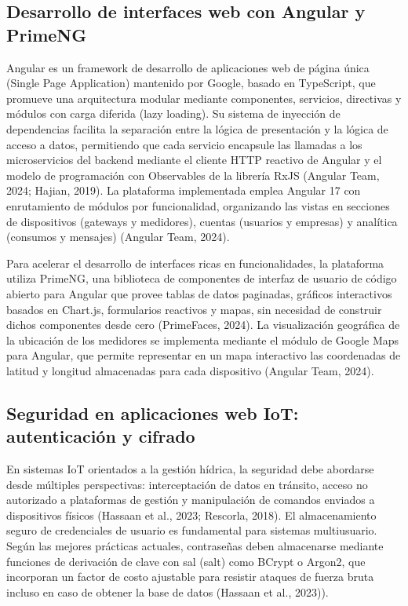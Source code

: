 \documentclass[12pt,a4paper,oneside]{report}
\begin{document}
\subsection{Desarrollo de interfaces web con Angular y PrimeNG}\label{desarrollo-de-interfaces-web-con-angular-y-primeng}

Angular es un framework de desarrollo de aplicaciones web de página única (Single Page Application) mantenido por Google, basado en TypeScript, que promueve una arquitectura modular mediante componentes, servicios, directivas y módulos con carga diferida (lazy loading). Su sistema de inyección de dependencias facilita la separación entre la lógica de presentación y la lógica de acceso a datos, permitiendo que cada servicio encapsule las llamadas a los microservicios del backend mediante el cliente HTTP reactivo de Angular y el modelo de programación con Observables de la librería RxJS (Angular Team, 2024; Hajian, 2019). La plataforma implementada emplea Angular 17 con enrutamiento de módulos por funcionalidad, organizando las vistas en secciones de dispositivos (gateways y medidores), cuentas (usuarios y empresas) y analítica (consumos y mensajes) (Angular Team, 2024).

Para acelerar el desarrollo de interfaces ricas en funcionalidades, la plataforma utiliza PrimeNG, una biblioteca de componentes de interfaz de usuario de código abierto para Angular que provee tablas de datos paginadas, gráficos interactivos basados en Chart.js, formularios reactivos y mapas, sin necesidad de construir dichos componentes desde cero (PrimeFaces, 2024). La visualización geográfica de la ubicación de los medidores se implementa mediante el módulo de Google Maps para Angular, que permite representar en un mapa interactivo las coordenadas de latitud y longitud almacenadas para cada dispositivo (Angular Team, 2024).

\subsection{Seguridad en aplicaciones web IoT: autenticación y cifrado}\label{seguridad-en-aplicaciones-web-iot-autenticaciuxf3n-y-cifrado}

En sistemas IoT orientados a la gestión hídrica, la seguridad debe abordarse desde múltiples perspectivas: interceptación de datos en tránsito, acceso no autorizado a plataformas de gestión y manipulación de comandos enviados a dispositivos físicos (Hassaan et al., 2023; Rescorla, 2018). El almacenamiento seguro de credenciales de usuario es fundamental para sistemas multiusuario. Según las mejores prácticas actuales, contraseñas deben almacenarse mediante funciones de derivación de clave con sal (salt) como BCrypt o Argon2, que incorporan un factor de costo ajustable para resistir ataques de fuerza bruta incluso en caso de obtener la base de datos (Hassaan et al., 2023)).
\end{document}
